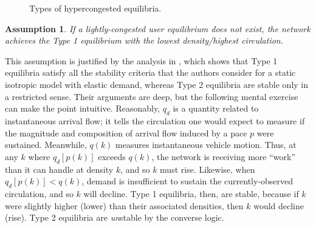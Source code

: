 \documentclass[preprint,authoryear]{elsarticle}
\newtheorem{assumption}{Assumption}
\begin{document}
\begin{figure}
	\centering
	\caption{Types of hypercongested equilibria.}
	\label{fig:hypercongestion}
\end{figure}

\begin{assumption}\label{ass:type1}
If a lightly-congested user equilibrium does not exist, the network achieves the Type 1 equilibrium with the lowest density/highest circulation.
\end{assumption}

This assumption is justified by the analysis in \citet{Arnott2010}, which shows that Type 1 equilibria satisfy all the stability criteria that the authors consider for a static isotropic model with elastic demand, whereas Type 2 equilibria are stable only in a restricted sense. Their arguments are deep, but the following mental exercise can make the point intuitive. Reasonably, $q_d$ is a quantity related to instantaneous arrival flow; it tells the circulation one would expect to measure if the magnitude and composition of arrival flow induced by a pace $p$ were sustained. Meanwhile, $q(k)$  measures instantaneous vehicle motion. Thus, at any $k$ where $q_d[p(k)]$ exceeds $q(k)$, the network is receiving more ``work'' than it can handle at density $k$, and so $k$ must rise. Likewise, when $q_d[p(k)]<q(k)$, demand is insufficient to sustain the currently-observed circulation, and so $k$ will decline. Type 1 equilibria, then, are stable, because if $k$ were slightly higher (lower) than their associated densities, then $k$ would decline (rise). Type 2 equilibria are \emph{un}stable by the converse logic.
\end{document}
